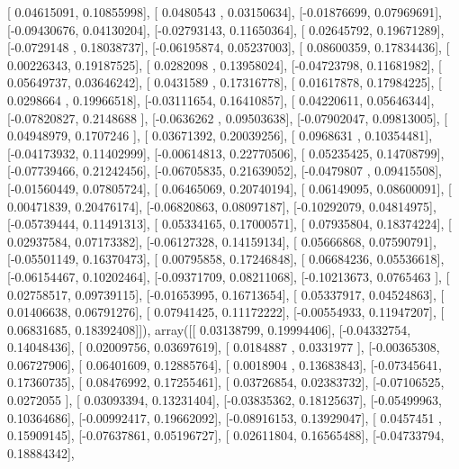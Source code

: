 \documentclass{article}
\begin{document}
       [ 0.04615091,  0.10855998],
       [ 0.0480543 ,  0.03150634],
       [-0.01876699,  0.07969691],
       [-0.09430676,  0.04130204],
       [-0.02793143,  0.11650364],
       [ 0.02645792,  0.19671289],
       [-0.0729148 ,  0.18038737],
       [-0.06195874,  0.05237003],
       [ 0.08600359,  0.17834436],
       [ 0.00226343,  0.19187525],
       [ 0.0282098 ,  0.13958024],
       [-0.04723798,  0.11681982],
       [ 0.05649737,  0.03646242],
       [ 0.0431589 ,  0.17316778],
       [ 0.01617878,  0.17984225],
       [ 0.0298664 ,  0.19966518],
       [-0.03111654,  0.16410857],
       [ 0.04220611,  0.05646344],
       [-0.07820827,  0.2148688 ],
       [-0.0636262 ,  0.09503638],
       [-0.07902047,  0.09813005],
       [ 0.04948979,  0.1707246 ],
       [ 0.03671392,  0.20039256],
       [ 0.0968631 ,  0.10354481],
       [-0.04173932,  0.11402999],
       [-0.00614813,  0.22770506],
       [ 0.05235425,  0.14708799],
       [-0.07739466,  0.21242456],
       [-0.06705835,  0.21639052],
       [-0.0479807 ,  0.09415508],
       [-0.01560449,  0.07805724],
       [ 0.06465069,  0.20740194],
       [ 0.06149095,  0.08600091],
       [ 0.00471839,  0.20476174],
       [-0.06820863,  0.08097187],
       [-0.10292079,  0.04814975],
       [-0.05739444,  0.11491313],
       [ 0.05334165,  0.17000571],
       [ 0.07935804,  0.18374224],
       [ 0.02937584,  0.07173382],
       [-0.06127328,  0.14159134],
       [ 0.05666868,  0.07590791],
       [-0.05501149,  0.16370473],
       [ 0.00795858,  0.17246848],
       [ 0.06684236,  0.05536618],
       [-0.06154467,  0.10202464],
       [-0.09371709,  0.08211068],
       [-0.10213673,  0.0765463 ],
       [ 0.02758517,  0.09739115],
       [-0.01653995,  0.16713654],
       [ 0.05337917,  0.04524863],
       [ 0.01406638,  0.06791276],
       [ 0.07941425,  0.11172222],
       [-0.00554933,  0.11947207],
       [ 0.06831685,  0.18392408]]), array([[ 0.03138799,  0.19994406],
       [-0.04332754,  0.14048436],
       [ 0.02009756,  0.03697619],
       [ 0.0184887 ,  0.0331977 ],
       [-0.00365308,  0.06727906],
       [ 0.06401609,  0.12885764],
       [ 0.0018904 ,  0.13683843],
       [-0.07345641,  0.17360735],
       [ 0.08476992,  0.17255461],
       [ 0.03726854,  0.02383732],
       [-0.07106525,  0.0272055 ],
       [ 0.03093394,  0.13231404],
       [-0.03835362,  0.18125637],
       [-0.05499963,  0.10364686],
       [-0.00992417,  0.19662092],
       [-0.08916153,  0.13929047],
       [ 0.0457451 ,  0.15909145],
       [-0.07637861,  0.05196727],
       [ 0.02611804,  0.16565488],
       [-0.04733794,  0.18884342],
\end{document}
